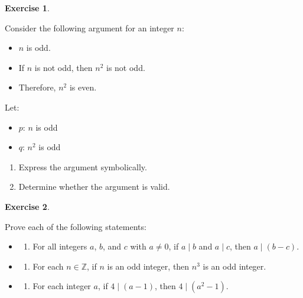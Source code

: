 \documentclass[
]{book}
\providecommand{\tightlist}{%
  \setlength{\itemsep}{0pt}\setlength{\parskip}{0pt}}
\theoremstyle{definition}
\theoremstyle{definition}
\theoremstyle{definition}
\newtheorem{exercise}{Exercise}[chapter]
\theoremstyle{definition}
\theoremstyle{remark}
\begin{document}
\begin{exercise}
\protect\hypertarget{exr:unnamed-chunk-140}{}\label{exr:unnamed-chunk-140}

Consider the following argument for an integer \(n\):

\begin{itemize}
\tightlist
\item
  \(n\) is odd.\\
\item
  If \(n\) is not odd, then \(n^2\) is not odd.\\
\item
  Therefore, \(n^2\) is even.
\end{itemize}

Let:

\begin{itemize}
\tightlist
\item
  \(p\): \(n\) is odd\\
\item
  \(q\): \(n^2\) is odd
\end{itemize}

\begin{enumerate}
\def\labelenumi{(\roman{enumi})}
\tightlist
\item
  Express the argument symbolically.\\
\item
  Determine whether the argument is valid.
\end{enumerate}

\end{exercise}

\begin{exercise}
\protect\hypertarget{exr:unnamed-chunk-141}{}\label{exr:unnamed-chunk-141}

Prove each of the following statements:

\begin{itemize}
\tightlist
\item
  \begin{enumerate}
  \def\labelenumi{(\alph{enumi})}
  \tightlist
  \item
    For all integers \(a\), \(b\), and \(c\) with \(a \neq 0\), if \(a \mid b\) and \(a \mid c\), then \(a \mid (b - c)\).
  \end{enumerate}
\item
  \begin{enumerate}
  \def\labelenumi{(\alph{enumi})}
  \setcounter{enumi}{1}
  \tightlist
  \item
    For each \(n \in \mathbb{Z}\), if \(n\) is an odd integer, then \(n^3\) is an odd integer.
  \end{enumerate}
\item
  \begin{enumerate}
  \def\labelenumi{(\alph{enumi})}
  \setcounter{enumi}{2}
  \tightlist
  \item
    For each integer \(a\), if \(4 \mid (a - 1)\), then \(4 \mid (a^2 - 1)\).
  \end{enumerate}
\end{itemize}

\end{exercise}
\end{document}
